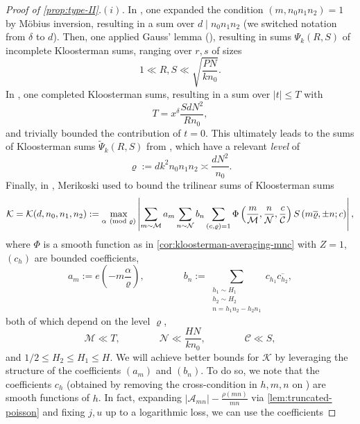 \documentclass[reqno,11pt]{amsart}
\theoremstyle{remark}
\numberwithin{equation}{section}
\newcommand{\MM}{\mathcal{M}}
\newcommand{\NN}{\mathcal{N}}
\newcommand{\CC}{\mathcal{C}}
\newcommand{\mA}{\mathcal{A}}
\newcommand{\mK}{\mathcal{K}}
\renewcommand{\bar}{\overline}
\renewcommand{\tilde}{\widetilde}
\renewcommand{\pmod}[1]{\ (\textnormal{mod } #1)}
\begin{document}
\begin{proof}[Proof of \cref{prop:type-II}.$(i)$]
In \cite[\S 3.6]{merikoski2023largest}, one expanded the condition $(m, n_0n_1n_2) = 1$ by M\"obius inversion, resulting in a sum over $d \mid n_0 n_1 n_2$ (we switched notation from $\delta$ to $d$). Then, one applied Gauss' lemma (\cite[Lemma 9]{merikoski2023largest}), resulting in sums $\Psi_k(R, S)$ of incomplete Kloosterman sums, ranging over $r, s$ of sizes 
\begin{equation} \label{eq:RS-values}
    1 \ll R, S \ll \sqrt{\frac{P N}{k n_0}}.
\end{equation}
In \cite[\S 3.7]{merikoski2023largest}, one completed Kloosterman sums, resulting in a sum over $|t| \le T$ with
\begin{equation} \label{eq:T-value}
    T = x^{\delta} \frac{Sd N^2}{Rn_0},
\end{equation}
and trivially bounded the contribution of $t = 0$. This ultimately leads to the sums of Kloosterman sums $\tilde{\Psi}_k(R, S)$
from \cite[p.\,1279]{merikoski2023largest}, which have a relevant \emph{level} of
\begin{equation} \label{eq:rho-value}
    \varrho := dk^2 n_0 n_1 n_2 \asymp \frac{dN^2}{n_0}.
\end{equation}
Finally, in \cite[\S 3.8]{merikoski2023largest}, Merikoski used \cite[Theorem 9]{deshouillers1982greatest} to bound the trilinear sums of Kloosterman sums
\[
    \mK = \mK(d, n_0, n_1, n_2) := \max_{\alpha \pmod{\varrho}} \left\vert 
    \sum_{m \sim \MM} a_m \sum_{n \sim \NN} b_n \sum_{(c, \varrho) = 1} \Phi\left(\frac{m}{\MM}, \frac{n}{\NN}, \frac{c}{\CC}\right) S\left(m \bar{\varrho}, \pm n; c\right) \right\vert,
\]
where $\Phi$ is a smooth function as in \cref{cor:kloosterman-averaging-mnc} with $Z = 1$, $(c_h)$ are bounded coefficients,
\begin{equation} \label{eq:am-bn-jori}
    a_m := e\left(-m\frac{\alpha}{\varrho}\right),
    \qquad\qquad 
    b_n := \sum_{\substack{h_1 \sim H_1 \\ h_2 \sim H_2 \\ n = h_1 n_2 - h_2 n_1}} c_{h_1} \bar{c_{h_2}},
\end{equation}
both of which depend on the level $\varrho$, 
\begin{equation} \label{eq:jori-mn-bounds}
    \MM \ll T, \qquad\qquad 
    \NN \ll \frac{HN}{kn_0}, 
    \qquad\qquad 
    \CC \ll S,
\end{equation}
and $1/2 \le H_2 \le H_1 \le H$.
We will achieve better bounds for $\mK$ by leveraging the structure of the coefficients $(a_m)$ and $(b_n)$. To do so, we note that the coefficients $c_h$ (obtained by removing the cross-condition in $h, m, n$ on \cite[p.\,1274]{merikoski2023largest}) are smooth functions of $h$. In fact, expanding $|\mA_{mn}| - \frac{\rho(mn)}{mn}$ via \cref{lem:truncated-poisson} and fixing $j, u$ up to a logarithmic loss, we can use the coefficients

\end{proof}
\end{document}
